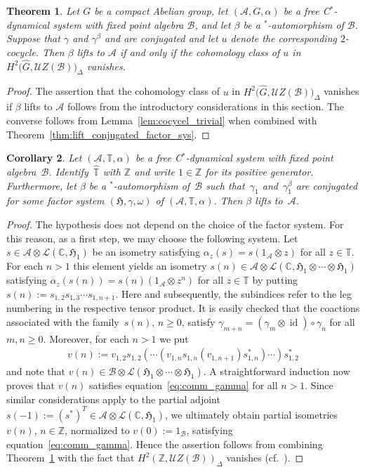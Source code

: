 \documentclass[10pt,a4paper]{amsart}
\numberwithin{equation}{section}
\newtheorem{Theorem}{Theorem}[section]
\newtheorem{Corollary}[Theorem]{Corollary}
\newcommand*{\Z}{\mathbb Z}		%
\newcommand*{\C}{\mathbb C}		%
\newcommand*{\tensor}{\otimes}		%
\DeclareMathOperator{\id}{id}		%
\newcommand*{\Star}{$^*$\nobreakdash}
\newcommand*{\hilb}{\mathfrak}		%
\newcommand*{\alg}{\mathcal}		%
\newcommand*{\hH}{\hilb{H}}			%
\newcommand*{\one}{1}				%
\newcommand*{\aA}{\alg{A}}			%
\newcommand*{\aB}{\alg{B}} 			%
\newcommand*{\End}{\mathcal{L}} %
\begin{document}
\begin{Theorem}\label{thm:lift_cohomology}
	Let $G$ be a compact Abelian group, let $(\aA, G, \alpha)$ be a free C\Star-dynamical system with fixed point algebra $\aB$, and let $\beta$ be a \Star-automorphism of $\aB$.
	Suppose that $\gamma$ and $\gamma^\beta$ and are conjugated and let $u$ denote the corresponding $2$-cocycle.
	Then $\beta$ lifts to $\aA$ if and only if the cohomology class of $u$ in $ H^2\big(\hat G,\mathcal{U}Z(\aB)\big)_{\Delta}$ vanishes.
\end{Theorem}
\begin{proof}The assertion that the cohomology class of $u$ in $H^2\big(\hat G,\mathcal{U}Z(\aB)\big)_{\Delta}$ vanishes if $\beta$ lifts to $\aA$ follows from the introductory considerations in this section.
	The converse follows from Lemma~\ref{lem:cocycel_trivial} when combined with Theorem~\ref{thm:lift_conjugated_factor_sys}.
\end{proof}

\begin{Corollary}\label{cor:torus_action}
	Let $(\aA, \mathbb{T}, \alpha)$ be a free C\Star-dynamical system with fixed point algebra~$\aB$.
	Identify~$\hat{\mathbb T}$ with $\Z$ and write $1 \in \Z$ for its positive generator.
	Furthermore, let $\beta$ be a \Star-automorphism of~$\aB$ such that~$\gamma_1$ and~$\gamma_1^\beta$ are conjugated for some factor system $(\hH, \gamma, \omega)$ of $(\aA, \mathbb T, \alpha)$.
	Then $\beta$ lifts to~$\aA$.
\end{Corollary}
\begin{proof}
	The hypothesis does not depend on the choice of the factor system.
	For this reason, as a first step, we may choose the following system.
	Let $s \in \aA \tensor \End(\C,\hH_1)$ be an isometry satisfying $\alpha_z ( s ) = s (\one_{\aA} \tensor z)$ for all $z \in \mathbb T$.
	For each $n > 1$ this element yields an isometry $s(n) \in \aA \tensor \End(\C,\hH_1 \tensor \cdots \tensor \hH_1)$
	satisfying $\alpha_z ( s(n) ) = s(n) (\one_{\aA} \tensor z^n)$ for all $z \in \mathbb T$ by putting $s(n) := s_{1,2} s_{1,3} \cdots s_{1,n+1}$.
	Here and subsequently, the subindices refer to the leg numbering in the respective tensor product.
	It is easily checked that the coactions associated with the family~$s(n)$, $n\geq 0$, satisfy $\gamma_{m+n} = (\gamma_m \tensor \id) \circ \gamma_n$ for all $m,n \geq 0$.
	Moreover, for each $n > 1$ we put
	\begin{gather*}
		v(n) :=
		v_{1,2} s_{1,2} ( \cdots ( v_{1,n} s_{1,n}(v_{1,n+1}) s^*_{1,n} ) \cdots ) s^*_{1,2}
	\end{gather*}
	and note that $v(n) \in \aB \tensor \End(\hH_1 \tensor \cdots \tensor \hH_1)$.
	A straightforward induction now proves that $v(n)$ satisfies
	equation~\eqref{eq:comm_gamma} for all $n > 1$.
	Since similar considerations apply to the partial adjoint $s(-1) := (s^*)^T \in \aA \tensor \End(\C,\hH_1)$,
	we ultimately obtain partial isometries $v(n)$, $n \in \Z$, normalized to $v(0) := \one_\aB$, satisfying equation~\eqref{eq:comm_gamma}.
	Hence the assertion follows from combining Theorem~\ref{thm:lift_cohomology} with the fact that $H^2 (\Z,\mathcal{U}Z(\aB) )_{\Delta}$ vanishes (cf.~\cite[Chapter~VI.6]{Mac95}).
\end{proof}
\end{document}
